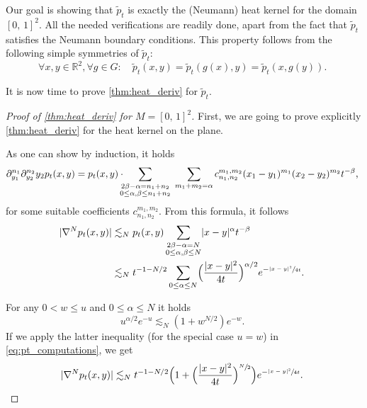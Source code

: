 \documentclass[10pt]{amsart}
\theoremstyle{plain}
\theoremstyle{definition}
\numberwithin{equation}{section}
\newcommand{\RR}{\ensuremath{\mathbb R}}
\newcommand{\cc}[2]{\ensuremath{\left[#1,\,#2\right]}}
\renewcommand{\comma}{\ensuremath{\text{, }}}
\newcommand{\comma}{\ensuremath{\text{, }}}
\newcommand{\fullstop}{\ensuremath{\text{. }}}
\DeclarePairedDelimiter\abs{\lvert}{\rvert}
\begin{document}
Our goal is showing that $\tilde p_t$ is exactly the (Neumann) heat kernel for the domain $\cc01^2$.
All the needed verifications are readily done, apart from the fact that $\tilde p_t$
satisfies the Neumann boundary conditions.
This property follows from the following simple symmetries of $\tilde p_t$:
\begin{equation*}
\forall x, y\in\RR^2, \forall g\in G: \quad
\tilde p_t(x, y) = \tilde p_t(g(x), y) = \tilde p_t(x, g(y)) \fullstop
\end{equation*}

It is now time to prove \cref{thm:heat_deriv} for $\tilde p_t$.
\begin{proof}[Proof of \cref{thm:heat_deriv} for $M=\cc01^2$]
First, we are going to prove explicitly \cref{thm:heat_deriv} for the heat kernel on the plane.

As one can show by induction, it holds
\begin{equation*}
\partial^{n_1}_{y_1}\partial_{y_2}^{n_2}{y_2} p_t(x,y) = p_t(x,y) \cdot\hspace*{-2mm}
\sum_{\substack{2\beta-\alpha=n_1+n_2 \\ 0\le \alpha,\beta\le n_1+n_2}}\hspace*{1mm}
\sum_{m_1+m_2 = \alpha} c_{n_1,n_2}^{m_1,m_2}(x_1-y_1)^{m_1}(x_2-y_2)^{m_2}t^{-\beta} \comma
\end{equation*}
for some suitable coefficients $c_{n_1,n_2}^{m_1,m_2}$. From this formula, it follows
\begin{gather}\begin{split}\label{eq:pt_computations}
\abs{\nabla^N p_t(x, y)}
&\lesssim_N p_t(x, y)\sum_{\substack{2\beta-\alpha=N \\ 0\le \alpha,\beta\le N}}
\abs{x-y}^\alpha t^{-\beta} \\
&\lesssim_N t^{-1-N/2}\sum_{0\le\alpha\le N}
\Bigl(\frac{\abs{x-y}^2}{4t}\Bigr)^{\alpha/2}e^{-\sfrac{\abs{x-y}^2}{4t}}\fullstop
\end{split}\end{gather}

For any $0<w\le u$ and
$0\le\alpha\le N$ it holds
\begin{equation}\label{eq:elementary_ineq}
u^{\alpha/2}e^{-u}\lesssim_N (1+w^{N/2})e^{-w} \fullstop
\end{equation}
If we apply the latter inequality (for the special case $u=w$) in \cref{eq:pt_computations}, we get
\begin{equation}\label{eq:pt_deriv}
\abs{\nabla^N p_t(x, y)}
\lesssim_N t^{-1-N/2}\Bigl(1
	 + \Bigl(\frac{\abs{x-y}^2}{4t}\Bigr)^{\sfrac N2}\Bigr) e^{-\sfrac{\abs{x-y}^2}{4t}} \fullstop
\end{equation}


\end{proof}
\end{document}
